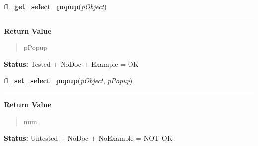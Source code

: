 \hspace{.8\funcindent}\begin{boxedminipage}{\funcwidth}

    \raggedright \textbf{fl\_get\_select\_popup}(\textit{pObject})

    \vspace{-1.5ex}

    \rule{\textwidth}{0.5\fboxrule}
\setlength{\parskip}{2ex}
\setlength{\parskip}{1ex}
      \textbf{Return Value}
    \vspace{-1ex}

      \begin{quote}
      pPopup

      \end{quote}

\textbf{Status:} Tested + NoDoc + Example = OK



    \end{boxedminipage}

    \label{xformslib:library:fl_set_select_popup}

    \vspace{0.5ex}

\hspace{.8\funcindent}\begin{boxedminipage}{\funcwidth}

    \raggedright \textbf{fl\_set\_select\_popup}(\textit{pObject}, \textit{pPopup})

    \vspace{-1.5ex}

    \rule{\textwidth}{0.5\fboxrule}
\setlength{\parskip}{2ex}
\setlength{\parskip}{1ex}
      \textbf{Return Value}
    \vspace{-1ex}

      \begin{quote}
      num

      \end{quote}

\textbf{Status:} Untested + NoDoc + NoExample = NOT OK



    \end{boxedminipage}

    \label{xformslib:library:fl_get_select_item}

